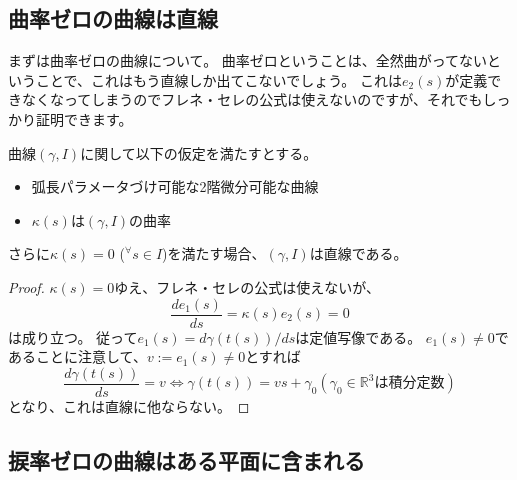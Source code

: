 \subsection{曲率ゼロの曲線は直線}

まずは曲率ゼロの曲線について。
曲率ゼロということは、全然曲がってないということで、これはもう直線しか出てこないでしょう。
これは$e_2(s)$が定義できなくなってしまうのでフレネ・セレの公式は使えないのですが、それでもしっかり証明できます。
\begin{example}
  曲線$(\gamma,I)$に関して以下の仮定を満たすとする。
  \begin{itemize}
    \item 弧長パラメータづけ可能な2階微分可能な曲線
    \item $\kappa(s)$は$(\gamma,I)$の曲率
  \end{itemize}
  さらに$\kappa(s)=0$ (${}^\forall s\in I$)を満たす場合、$(\gamma,I)$は直線である。
\end{example}
\begin{proof}
  $\kappa(s)=0$ゆえ、フレネ・セレの公式は使えないが、
  \[\frac{de_1(s)}{ds}=\kappa(s)e_2(s)=0\]
  は成り立つ。
  従って$e_1(s)=d\gamma(t(s))/ds$は定値写像である。
  $e_1(s)\neq0$であることに注意して、$v:=e_1(s)\neq0$とすれば
  \[
    \frac{d\gamma(t(s))}{ds}=v \iff \gamma(t(s))=vs+\gamma_0(\text{$\gamma_0\in\mathbb{R}^3$は積分定数})
  \]
  となり、これは直線に他ならない。
\end{proof}

\subsection{捩率ゼロの曲線はある平面に含まれる}

